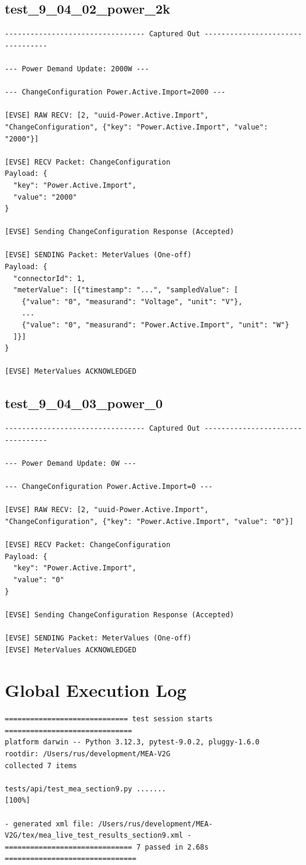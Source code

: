 \documentclass{article}
\begin{document}
\subsection*{test\_9\_04\_02\_power\_2k}
\begin{lstlisting}
--------------------------------- Captured Out ---------------------------------

--- Power Demand Update: 2000W ---

--- ChangeConfiguration Power.Active.Import=2000 ---

[EVSE] RAW RECV: [2, "uuid-Power.Active.Import", "ChangeConfiguration", {"key": "Power.Active.Import", "value": "2000"}]

[EVSE] RECV Packet: ChangeConfiguration
Payload: {
  "key": "Power.Active.Import",
  "value": "2000"
}

[EVSE] Sending ChangeConfiguration Response (Accepted)

[EVSE] SENDING Packet: MeterValues (One-off)
Payload: {
  "connectorId": 1,
  "meterValue": [{"timestamp": "...", "sampledValue": [
    {"value": "0", "measurand": "Voltage", "unit": "V"},
    ...
    {"value": "0", "measurand": "Power.Active.Import", "unit": "W"}
  ]}]
}

[EVSE] MeterValues ACKNOWLEDGED
\end{lstlisting}

\subsection*{test\_9\_04\_03\_power\_0}
\begin{lstlisting}
--------------------------------- Captured Out ---------------------------------

--- Power Demand Update: 0W ---

--- ChangeConfiguration Power.Active.Import=0 ---

[EVSE] RAW RECV: [2, "uuid-Power.Active.Import", "ChangeConfiguration", {"key": "Power.Active.Import", "value": "0"}]

[EVSE] RECV Packet: ChangeConfiguration
Payload: {
  "key": "Power.Active.Import",
  "value": "0"
}

[EVSE] Sending ChangeConfiguration Response (Accepted)

[EVSE] SENDING Packet: MeterValues (One-off)
[EVSE] MeterValues ACKNOWLEDGED
\end{lstlisting}

\section{Global Execution Log}
\begin{lstlisting}
============================= test session starts ==============================
platform darwin -- Python 3.12.3, pytest-9.0.2, pluggy-1.6.0
rootdir: /Users/rus/development/MEA-V2G
collected 7 items

tests/api/test_mea_section9.py .......                                   [100%]

- generated xml file: /Users/rus/development/MEA-V2G/tex/mea_live_test_results_section9.xml -
============================== 7 passed in 2.68s ===============================
\end{lstlisting}
\end{document}
